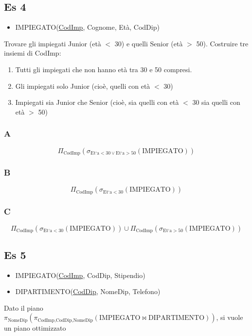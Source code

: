 \subsection{Es 4}
\begin{itemize}
    \item IMPIEGATO(\underline{CodImp}, Cognome, Et\`a, CodDip)
\end{itemize}
Trovare gli impiegati Junior (et\`a $<$ 30) e quelli Senior (et\`a $>$ 50). Costruire tre insiemi di CodImp:
\begin{enumerate}
    \item[a.] Tutti gli impiegati che non hanno et\`a tra 30 e 50 compresi.
    \item[b.] Gli impiegati solo Junior (cio\`e, quelli con et\`a $<$ 30)
    \item[c.] Impiegati sia Junior che Senior (cio\`e, sia quelli con et\`a $<$ 30 sia quelli con et\`a $>$ 50)
\end{enumerate}

\subsubsection{A}
$$ \Pi_{\text{CodImp}} (\sigma_{\text{Et`a} < 30 \lor \text{Et`a} > 50}(\text{IMPIEGATO})) $$

\subsubsection{B}
$$ \Pi_{\text{CodImp}} (\sigma_{\text{Et`a} < 30}(\text{IMPIEGATO})) $$

\subsubsection{C}
$$ \Pi_{\text{CodImp}} (\sigma_{\text{Et`a} < 30}(\text{IMPIEGATO})) \cup \Pi_{\text{CodImp}} (\sigma_{\text{Et`a} > 50}(\text{IMPIEGATO})) $$

\subsection{Es 5}
\begin{itemize}
    \item IMPIEGATO(\underline{CodImp}, CodDip, Stipendio)
    \item DIPARTIMENTO(\underline{CodDip}, NomeDip, Telefono)
\end{itemize}
Dato il piano $\pi_{\text{NomeDip}}(\pi_{\text{CodImp,CodDip,NomeDip}}(\text{IMPIEGATO} \bowtie \text{DIPARTIMENTO}))$, si vuole un piano ottimizzato

